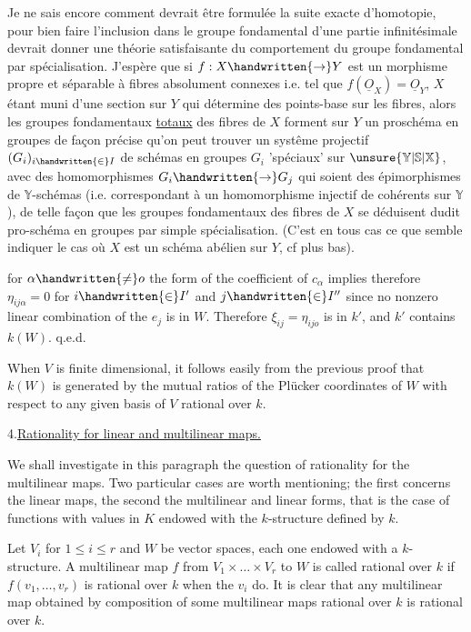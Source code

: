 Je ne sais encore comment devrait être formulée la suite exacte d'homotopie, pour bien faire l'inclusion dans le groupe fondamental d'une partie infinitésimale devrait donner une théorie satisfaisante du comportement du groupe fondamental par spécialisation. J'espère que si $f:X\handwritten{\to}Y$ est un morphisme propre et séparable à fibres absolument connexes i.e. tel que $f(\underline{O}_X)=\underline{O}_Y$, $X$ étant muni   d'une section  sur $Y$ qui détermine des points-base sur les fibres, alors les groupes fondamentaux \uline{totaux} des fibres de $X$ forment sur $Y$ un proschéma en groupes  de façon précise qu'on peut trouver un systême projectif  $(G_i)_{i\handwritten{\in}I}$ de schémas en groupes $G_i$ 'spéciaux' sur $\unsure{\mathbb{Y}|\mathbb{S}|\mathbb{X}}$, avec des homomorphismes $G_i\handwritten{\to}G_j$ qui soient des épimorphismes de $\mathbb{Y}$-schémas (i.e. correspondant à un homomorphisme injectif de  cohérents sur $\mathbb{Y}$), de telle façon que les groupes fondamentaux  des fibres de $X$ se déduisent dudit pro-schéma en groupes par simple spécialisation. (C'est en tous cas ce que semble indiquer le cas où $X$ est un schéma abélien sur $Y$, cf plus bas).

for $\alpha\handwritten{\ne}o$ the form of the coefficient of $c_\alpha$ implies therefore $\eta_{ij\alpha}=0$ for $i\handwritten{\in}I'$ and $j\handwritten{\in}I''$ since no nonzero linear combination of the $e_j$ is in $W$. Therefore $\xi_{ij}=\eta_{ijo}$ is in $k'$, and $k'$ contains $k(W)$. \hfill q.e.d.

When $V$ is finite dimensional, it follows easily from the previous proof that $k(W)$ is generated by the mutual ratios of the Plücker coordinates of $W$ with respect to any given basis of $V$ rational over $k$.

4.\quad \uline{Rationality for linear and multilinear maps.}

We shall investigate in this paragraph the question of rationality for the multilinear maps. Two particular cases are worth mentioning; the first concerns the linear maps, the second the multilinear and linear forms, that is the case of functions with values in $K$ endowed with the $k$-structure defined by $k$.

Let $V_i$ for $1\leq i\leq r$ and $W$ be vector spaces, each one endowed with a $k$-structure. A multilinear map $f$ from $V_1\times\ldots\times V_r$ to $W$ is called rational over $k$ if $f(v_1,\ldots,v_r)$ is rational over $k$ when the $v_i$ do. It is clear that any multilinear map obtained by composition of some multilinear maps rational over $k$ is rational over $k$.

